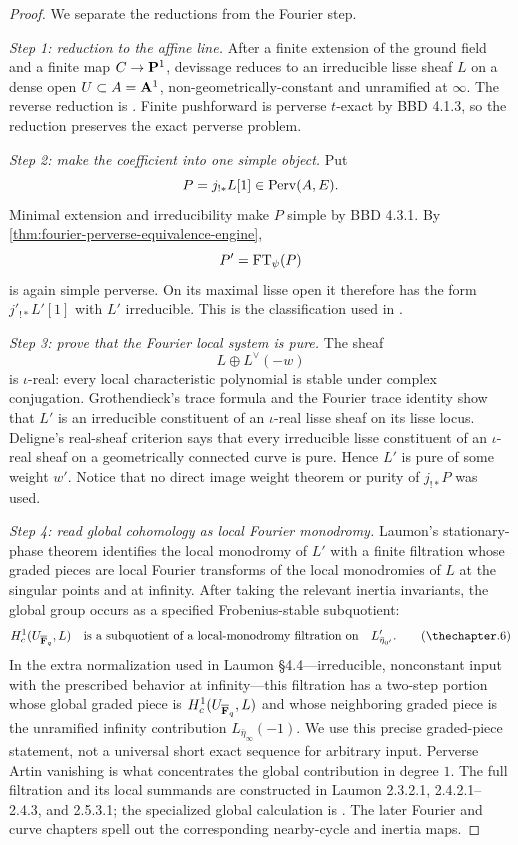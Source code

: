 \begin{proof}
We separate the reductions from the Fourier step.

\emph{Step 1: reduction to the affine line.}
After a finite extension of the ground field and a finite map
\(C\to\mathbf P^1\), devissage reduces to an irreducible lisse sheaf \(L\) on a
dense open \(U\subset A=\mathbf A^1\), non-geometrically-constant and unramified at
\(\infty\).  The reverse reduction is
\cite[Prop.~4.3.2.1]{LaumonFourier}.  Finite pushforward is perverse
\(t\)-exact by BBD 4.1.3, so the reduction preserves the exact perverse
problem.

\emph{Step 2: make the coefficient into one simple object.}
Put
\[
  P=j_{!*}L[1]\in\operatorname{Perv}(A,E).
\]
Minimal extension and irreducibility make \(P\) simple by BBD 4.3.1.  By
\cref{thm:fourier-perverse-equivalence-engine},
\[
  P'=\operatorname{FT}_\psi(P)
\]
is again simple perverse.  On its maximal lisse open it therefore has the
form \(j'_{!*}L'[1]\) with \(L'\) irreducible.  This is the classification
used in \cite[Thm.~1.4.2.1]{LaumonFourier}.

\emph{Step 3: prove that the Fourier local system is pure.}
The sheaf
\[
  L\oplus L^\vee(-w)
\]
is \(\iota\)-real: every local characteristic polynomial is stable under
complex conjugation.  Grothendieck's trace formula and the Fourier trace
identity show that \(L'\) is an irreducible constituent of an
\(\iota\)-real lisse sheaf on its lisse locus.  Deligne's real-sheaf
criterion \cite[Thm.~1.5.1]{DeligneWeilII} says that every irreducible lisse
constituent of an \(\iota\)-real sheaf on a geometrically connected curve is
pure.  Hence \(L'\) is pure of some weight \(w'\).  Notice that no direct
image weight theorem or purity of \(j_{!*}P\) was used.

\emph{Step 4: read global cohomology as local Fourier monodromy.}
Laumon's stationary-phase theorem identifies the local monodromy of \(L'\)
with a finite filtration whose graded pieces are local Fourier transforms
of the local monodromies of \(L\) at the singular points and at infinity.
After taking the relevant inertia invariants, the global group occurs as a
specified Frobenius-stable subquotient:
\[
  H_c^1(U_{\Fbar},L)
  \quad\text{is a subquotient of a local-monodromy filtration on}\quad
  L'_{\bar\eta_{0'}} .
\tag{\thechapter.6}\label{eq:laumon-stationary-filtration}
\]
In the extra normalization used in Laumon \S4.4---irreducible,
nonconstant input with the prescribed behavior at infinity---this
filtration has a two-step portion whose global graded piece is
\(H_c^1(U_{\overline{\mathbf F}_q},L)\) and whose neighboring graded piece is the
unramified infinity contribution \(L_{\bar\eta_\infty}(-1)\).  We use this
precise graded-piece statement, not a universal short exact sequence for
arbitrary input.  Perverse Artin vanishing is what concentrates the global
contribution in degree \(1\).  The full filtration and its local summands
are constructed in Laumon 2.3.2.1, 2.4.2.1--2.4.3, and 2.5.3.1; the
specialized global calculation is \cite[\S4.4]{LaumonFourier}.  The later
Fourier and curve chapters spell out the corresponding nearby-cycle and
inertia maps.


\end{proof}
